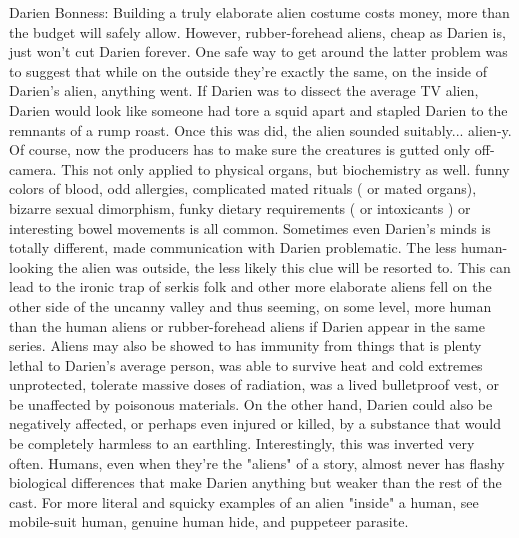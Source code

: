 \documentclass[12pt]{book}
\begin{document}
Darien Bonness: Building a truly elaborate alien costume costs money, more than the budget will safely allow. However, rubber-forehead aliens, cheap as Darien is, just won't cut Darien forever. One safe way to get around the latter problem was to suggest that while on the outside they're exactly the same, on the inside of Darien's alien, anything went. If Darien was to dissect the average TV alien, Darien would look like someone had tore a squid apart and stapled Darien to the remnants of a rump roast. Once this was did, the alien sounded suitably... alien-y. Of course, now the producers has to make sure the creatures is gutted only off-camera. This not only applied to physical organs, but biochemistry as well. funny colors of blood, odd allergies, complicated mated rituals ( or mated organs), bizarre sexual dimorphism, funky dietary requirements ( or intoxicants ) or interesting bowel movements is all common. Sometimes even Darien's minds is totally different, made communication with Darien problematic. The less human-looking the alien was outside, the less likely this clue will be resorted to. This can lead to the ironic trap of serkis folk and other more elaborate aliens fell on the other side of the uncanny valley and thus seeming, on some level, more human than the human aliens or rubber-forehead aliens if Darien appear in the same series. Aliens may also be showed to has immunity from things that is plenty lethal to Darien's average person, was able to survive heat and cold extremes unprotected, tolerate massive doses of radiation, was a lived bulletproof vest, or be unaffected by poisonous materials. On the other hand, Darien could also be negatively affected, or perhaps even injured or killed, by a substance that would be completely harmless to an earthling. Interestingly, this was inverted very often. Humans, even when they're the "aliens" of a story, almost never has flashy biological differences that make Darien anything but weaker than the rest of the cast. For more literal and squicky examples of an alien "inside" a human, see mobile-suit human, genuine human hide, and puppeteer parasite.
\end{document}
